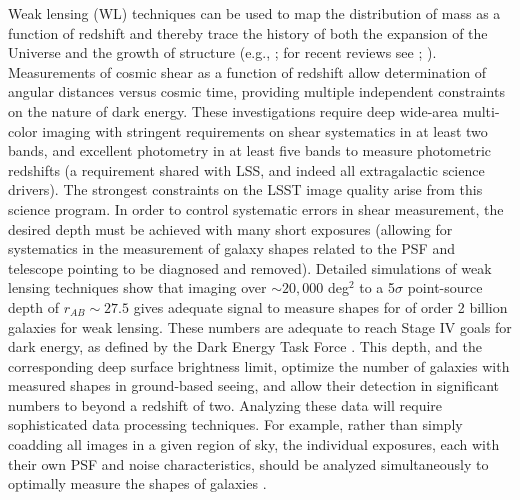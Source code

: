 Weak lensing (WL) techniques can be used to map the distribution of
mass as a function of redshift and thereby trace the history of both
the expansion of the Universe and the growth of structure (e.g., \citealt{1999ApJ...514L..65H};
for recent reviews see \citealt{2015RPPh...78h6901K}; \citealt{2018ARA&A..56..393M}).  Measurements of cosmic shear as a function of
redshift allow determination of angular distances versus cosmic time,
providing multiple independent constraints on the nature of dark
energy.  These investigations require deep wide-area multi-color
imaging with stringent requirements on shear systematics in at least
two bands, and excellent photometry in at least five bands to measure
photometric redshifts (a requirement shared with LSS, and indeed all
extragalactic science drivers). The strongest constraints on the LSST
image quality arise from this science program. In order to control
systematic errors in shear measurement, the desired depth must be
achieved with many short exposures (allowing for systematics in the
measurement of galaxy shapes related
to the PSF and telescope pointing to be diagnosed and removed). Detailed simulations of
weak lensing techniques show that imaging over $\sim20,000$ deg$^2$ to
a 5$\sigma$ point-source depth of $r_{AB} \sim 27.5$ gives adequate
signal to measure shapes for of order 2 billion galaxies for weak
lensing.  These numbers are adequate to reach
Stage IV goals for dark energy, as defined by the Dark Energy Task
Force \citep{2006astro.ph..9591A}.
This
depth, and the corresponding deep surface brightness limit,
optimize the number of galaxies with measured shapes in ground-based
seeing, and allow their detection in significant numbers to beyond a
redshift of two.  Analyzing these data will
require sophisticated data processing techniques.  For example, rather
than simply coadding all images in a given region of sky, the
individual exposures, each with their own PSF and noise
characteristics,  should be analyzed simultaneously to optimally
measure the shapes of galaxies \citep{2008ASPC..394..107T,2011PASP..123..596J}.

